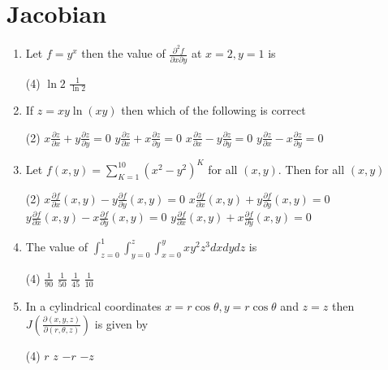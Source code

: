 \section{Jacobian}
\begin{enumerate}
	\item Let $f=y^{x}$ then the value of $\frac{\partial^{2} f}{\partial x \partial y}$ at $x=2, y=1$ is
	 \begin{tasks}(4)
		\task[\textbf{b.}]$\ln 2$
		\task[\textbf{d.}]  $\frac{1}{\ln 2}$
	\end{tasks}
	\item If $z=x y \ln (x y)$ then which of the following is correct
	 \begin{tasks}(2)
		\task[\textbf{a.}]$x \frac{\partial z}{\partial x}+y \frac{\partial z}{\partial y}=0$
		\task[\textbf{b.}]$y \frac{\partial z}{\partial x}+x \frac{\partial z}{\partial y}=0$
		\task[\textbf{c.}]$x \frac{\partial z}{\partial x}-y \frac{\partial z}{\partial y}=0$
		\task[\textbf{d.}]  $y \frac{\partial z}{\partial x}-x \frac{\partial z}{\partial y}=0$
	\end{tasks}
	\item Let $f(x, y)=\sum_{K=1}^{10}\left(x^{2}-y^{2}\right)^{K}$ for all $(x, y)$. Then for all $(x, y)$
	 \begin{tasks}(2)
		\task[\textbf{a.}]$x \frac{\partial f}{\partial x}(x, y)-y \frac{\partial f}{\partial y}(x, y)=0$
		\task[\textbf{b.}]$x \frac{\partial f}{\partial x}(x, y)+y \frac{\partial f}{\partial y}(x, y)=0$
		\task[\textbf{c.}]$y \frac{\partial f}{\partial x}(x, y)-x \frac{\partial f}{\partial y}(x, y)=0$
		\task[\textbf{d.}] $y \frac{\partial f}{\partial x}(x, y)+x \frac{\partial f}{\partial y}(x, y)=0$
	\end{tasks}
	\item The value of $\int_{z=0}^{1} \int_{y=0}^{z} \int_{x=0}^{y} x y^{2} z^{3} d x d y d z$ is
	 \begin{tasks}(4)
		\task[\textbf{a.}]$\frac{1}{90}$
		\task[\textbf{b.}]$\frac{1}{50}$
		\task[\textbf{c.}]$\frac{1}{45}$
		\task[\textbf{d.}] $\frac{1}{10}$
	\end{tasks}
	\item In a cylindrical coordinates $x=r \cos \theta, y=r \cos \theta$ and $z=z$ then $J\left(\frac{\partial(x, y, z)}{\partial(r, \theta, z)}\right)$ is given by
	 \begin{tasks}(4)
		\task[\textbf{a.}]$r$
		\task[\textbf{b.}]$z$
		\task[\textbf{c.}]$-r$
		\task[\textbf{d.}] $-z$
	\end{tasks}

\end{enumerate}
